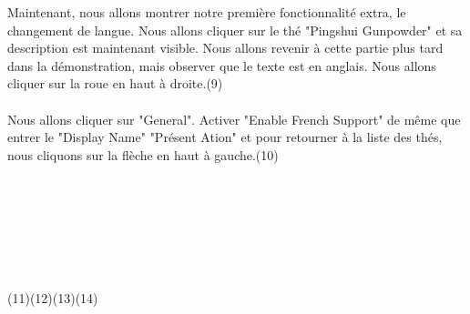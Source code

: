 \documentclass[a4paper,12pt]{article}
\begin{document}
\begin{spacing}{1}
	Maintenant, nous allons montrer notre première fonctionnalité extra, le changement de langue. Nous allons cliquer sur le thé "Pingshui Gunpowder" et sa description est maintenant visible. Nous allons revenir à cette partie plus tard dans la démonstration, mais observer que le texte est en anglais. Nous allons cliquer sur la roue en haut à droite.(9) \\\\
	Nous allons cliquer sur "General". Activer "Enable French Support" de même que entrer le "Display Name" "Présent Ation" et pour retourner à la liste des thés, nous cliquons sur la flèche en haut à gauche.(10) 
	\\\\\\\\\\\\\\\\
	(11)\space\space\space\space\space\space\space\space\space\space\space\space\space\space\space\space\space\space\space\space\space\space\space(12)\space\space\space\space\space\space\space\space\space\space\space\space\space\space\space\space\space\space\space\space\space\space\space(13)\space\space\space\space\space\space\space\space\space\space\space\space\space\space\space\space\space\space\space\space\space\space\space(14)\\

\end{spacing}
\end{document}
